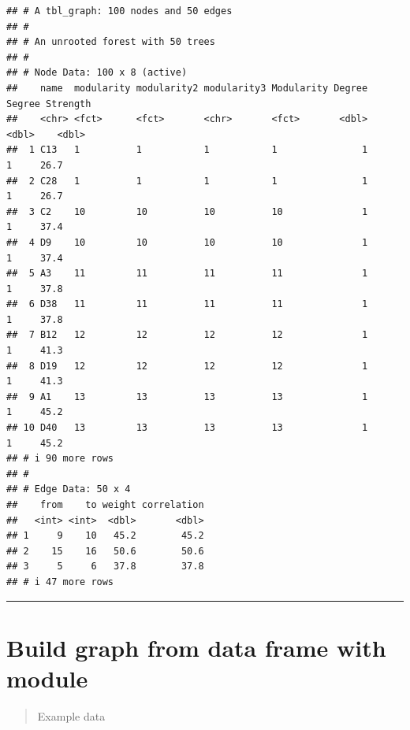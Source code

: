 \documentclass[
]{book}
\newenvironment{Shaded}{\begin{snugshade}}{\end{snugshade}}
\newcommand{\CommentTok}[1]{\textcolor[rgb]{0.56,0.35,0.01}{\textit{#1}}}
\newcommand{\FunctionTok}[1]{\textcolor[rgb]{0.13,0.29,0.53}{\textbf{#1}}}
\newcommand{\NormalTok}[1]{#1}
\newcommand{\OtherTok}[1]{\textcolor[rgb]{0.56,0.35,0.01}{#1}}
\newcommand{\SpecialCharTok}[1]{\textcolor[rgb]{0.81,0.36,0.00}{\textbf{#1}}}
\newcommand{\StringTok}[1]{\textcolor[rgb]{0.31,0.60,0.02}{#1}}
\begin{document}
\begin{verbatim}
## # A tbl_graph: 100 nodes and 50 edges
## #
## # An unrooted forest with 50 trees
## #
## # Node Data: 100 x 8 (active)
##    name  modularity modularity2 modularity3 Modularity Degree Segree Strength
##    <chr> <fct>      <fct>       <chr>       <fct>       <dbl>  <dbl>    <dbl>
##  1 C13   1          1           1           1               1      1     26.7
##  2 C28   1          1           1           1               1      1     26.7
##  3 C2    10         10          10          10              1      1     37.4
##  4 D9    10         10          10          10              1      1     37.4
##  5 A3    11         11          11          11              1      1     37.8
##  6 D38   11         11          11          11              1      1     37.8
##  7 B12   12         12          12          12              1      1     41.3
##  8 D19   12         12          12          12              1      1     41.3
##  9 A1    13         13          13          13              1      1     45.2
## 10 D40   13         13          13          13              1      1     45.2
## # i 90 more rows
## #
## # Edge Data: 50 x 4
##    from    to weight correlation
##   <int> <int>  <dbl>       <dbl>
## 1     9    10   45.2        45.2
## 2    15    16   50.6        50.6
## 3     5     6   37.8        37.8
## # i 47 more rows
\end{verbatim}

\begin{center}\rule{0.5\linewidth}{0.5pt}\end{center}

\section{Build graph from data frame with module}\label{build-graph-from-data-frame-with-module}

\begin{quote}
Example data
\end{quote}

\begin{Shaded}
\end{Shaded}
\end{document}
